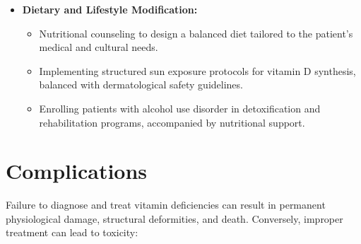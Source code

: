 \begin{itemize}
    \item \textbf{Dietary and Lifestyle Modification:}
    \begin{itemize}
        \item Nutritional counseling to design a balanced diet tailored to the patient's medical and cultural needs.
        \item Implementing structured sun exposure protocols for vitamin D synthesis, balanced with dermatological safety guidelines.
        \item Enrolling patients with alcohol use disorder in detoxification and rehabilitation programs, accompanied by nutritional support.
    \end{itemize}
\end{itemize}

\section*{Complications}
Failure to diagnose and treat vitamin deficiencies can result in permanent physiological damage, structural deformities, and death. Conversely, improper treatment can lead to toxicity:

